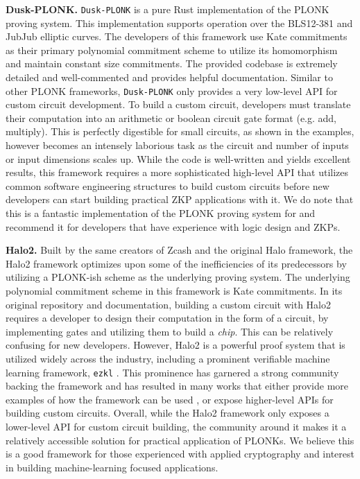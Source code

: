 

\textbf{Dusk-PLONK.}
\texttt{Dusk-PLONK} \cite{DuskPlonk2023Rust} is a pure Rust implementation of the PLONK proving system. This implementation supports operation over the BLS12-381 and JubJub elliptic curves. The developers of this framework use Kate commitments \cite{kate2010constant} as their primary polynomial commitment scheme to utilize its homomorphism and maintain constant size commitments. The provided codebase is extremely detailed and well-commented and provides helpful documentation. Similar to other PLONK frameworks, \texttt{Dusk-PLONK} only provides a very low-level API for custom circuit development. To build a custom circuit, developers must translate their computation into an arithmetic or boolean circuit gate format (e.g. add, multiply). This is perfectly digestible for small circuits, as shown in the examples, however becomes an intensely laborious task as the circuit and number of inputs or input dimensions scales up. While the code is well-written and yields excellent results, this framework requires a more sophisticated high-level API that utilizes common software engineering structures to build custom circuits before new developers can start building practical ZKP applications with it. We do note that this is a fantastic implementation of the PLONK proving system for and recommend it for developers that have experience with logic design and ZKPs. 

\textbf{Halo2.}
Built by the same creators of Zcash and the original Halo \cite{bowe2019recursive} framework, the Halo2 framework \cite{Halo22023Book} optimizes upon some of the inefficiencies of its predecessors by utilizing a PLONK-ish scheme as the underlying proving system. The underlying polynomial commitment scheme in this framework is Kate commitments. In its original repository and documentation, building a custom circuit with Halo2 requires a developer to design their computation in the form of a circuit, by implementing gates and utilizing them to build a \textit{chip}. This can be relatively confusing for new developers.
However, Halo2 is a powerful proof system that is utilized widely across the industry, including a prominent verifiable machine learning framework, \texttt{ezkl} \cite{ZkonduitInc2023EZKL}. This prominence has garnered a strong community backing the framework and has resulted in many works that either provide more examples of how the framework can be used \cite{Halo2Club2023}, or expose higher-level APIs for building custom circuits. Overall, while the Halo2 framework only exposes a lower-level API for custom circuit building, the community around it makes it a relatively accessible solution for practical application of PLONKs. We believe this is a good framework for those experienced with applied cryptography and interest in building machine-learning focused applications.


